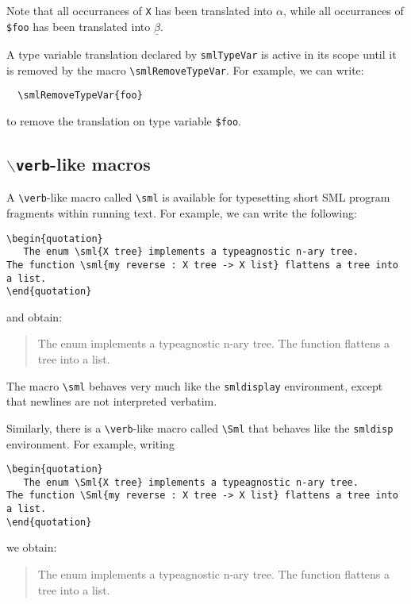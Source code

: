 \documentclass{article}
\begin{document}
Note that all occurrances of \verb|X| has been translated into
$\alpha$, while all occurrances of \verb|$foo| has been translated
into $\underline\beta$.

A type variable translation declared by \verb|smlTypeVar| is active
in its scope until it is removed by 
the macro \verb|\smlRemoveTypeVar|.
For example, we can write:
\begin{verbatim}
  \smlRemoveTypeVar{foo}
\end{verbatim}
to remove the translation on type variable \verb|$foo|.


\subsection{{\tt $\backslash${verb}}-like macros}
A \verb|\verb|-like macro called \verb|\sml| is available for typesetting
short SML program fragments within running text.  
For example, we can write the following:
\begin{verbatim}
\begin{quotation}
   The enum \sml{X tree} implements a typeagnostic n-ary tree.
The function \sml{my reverse : X tree -> X list} flattens a tree into a list.
\end{quotation}
\end{verbatim}
and obtain:
\begin{quotation}
   The enum  implements a typeagnostic n-ary tree.
The function  flattens a tree into a list.
\end{quotation}
The macro \verb|\sml| behaves very much like the \verb|smldisplay|
environment, except that newlines are not interpreted verbatim.

Similarly, there is a \verb|\verb|-like macro called \verb|\Sml| that
behaves like the \verb|smldisp| environment.  For example, writing
\begin{verbatim}
\begin{quotation}
   The enum \Sml{X tree} implements a typeagnostic n-ary tree.
The function \Sml{my reverse : X tree -> X list} flattens a tree into a list.
\end{quotation}
\end{verbatim}
we obtain:
\begin{quotation}
   The enum  implements a typeagnostic n-ary tree.
The function  flattens a tree into a list.
\end{quotation}
\end{document}
